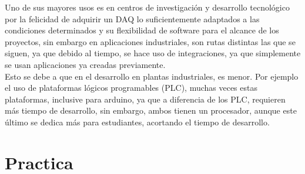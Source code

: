 \documentclass[12pt,letterpaper, onecolumn, titlepage, oneside]{book}
\begin{document}
Uno de sus mayores usos es en centros de investigación y desarrollo tecnológico por la felicidad de adquirir un DAQ lo suficientemente adaptados a las condiciones determinados y su flexibilidad de software para el alcance de los proyectos, sin embargo en aplicaciones industriales, son rutas distintas las que se siguen, ya que debido al tiempo, se hace uso de integraciones, ya que simplemente se usan aplicaciones ya creadas previamente.\\

Esto se debe a que en el desarrollo en plantas industriales, es menor. Por ejemplo el uso de plataformas lógicos programables (PLC), muchas veces estas plataformas, inclusive para arduino, ya que a diferencia de los PLC, requieren más tiempo de desarrollo, sin embargo, ambos tienen un procesador, aunque este último se dedica más para estudiantes, acortando el tiempo de desarrollo.

\chapter{Practica}
\end{document}
